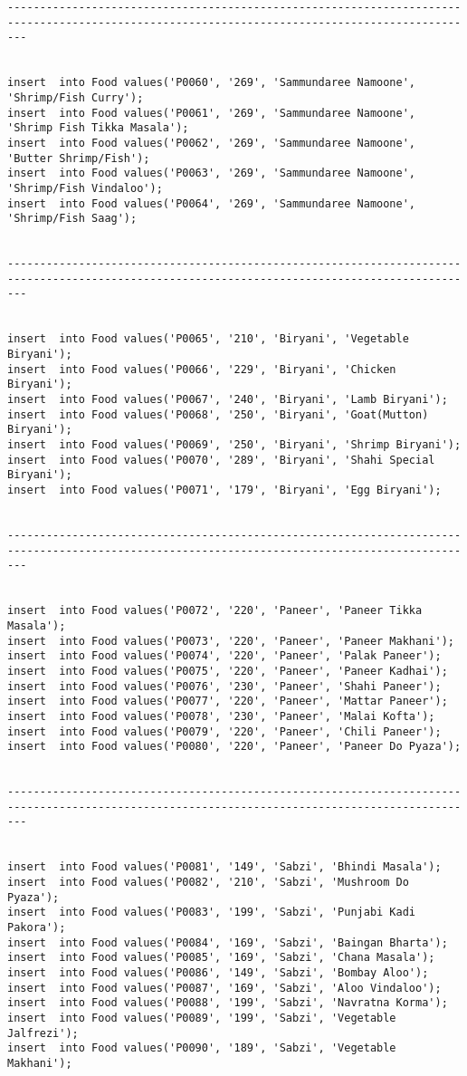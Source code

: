\documentclass[a4,12pt]{report}
\begin{document}
\begin{lstlisting}
-----------------------------------------------------------------------------------------------------------------------------------------------


insert  into Food values('P0060', '269', 'Sammundaree Namoone', 'Shrimp/Fish Curry');
insert  into Food values('P0061', '269', 'Sammundaree Namoone', 'Shrimp Fish Tikka Masala');
insert  into Food values('P0062', '269', 'Sammundaree Namoone', 'Butter Shrimp/Fish');
insert  into Food values('P0063', '269', 'Sammundaree Namoone', 'Shrimp/Fish Vindaloo');
insert  into Food values('P0064', '269', 'Sammundaree Namoone', 'Shrimp/Fish Saag');


-----------------------------------------------------------------------------------------------------------------------------------------------


insert  into Food values('P0065', '210', 'Biryani', 'Vegetable Biryani');
insert  into Food values('P0066', '229', 'Biryani', 'Chicken Biryani');
insert  into Food values('P0067', '240', 'Biryani', 'Lamb Biryani');
insert  into Food values('P0068', '250', 'Biryani', 'Goat(Mutton) Biryani');
insert  into Food values('P0069', '250', 'Biryani', 'Shrimp Biryani');
insert  into Food values('P0070', '289', 'Biryani', 'Shahi Special Biryani');
insert  into Food values('P0071', '179', 'Biryani', 'Egg Biryani');


-----------------------------------------------------------------------------------------------------------------------------------------------


insert  into Food values('P0072', '220', 'Paneer', 'Paneer Tikka Masala');
insert  into Food values('P0073', '220', 'Paneer', 'Paneer Makhani');
insert  into Food values('P0074', '220', 'Paneer', 'Palak Paneer');
insert  into Food values('P0075', '220', 'Paneer', 'Paneer Kadhai');
insert  into Food values('P0076', '230', 'Paneer', 'Shahi Paneer');
insert  into Food values('P0077', '220', 'Paneer', 'Mattar Paneer');
insert  into Food values('P0078', '230', 'Paneer', 'Malai Kofta');
insert  into Food values('P0079', '220', 'Paneer', 'Chili Paneer');
insert  into Food values('P0080', '220', 'Paneer', 'Paneer Do Pyaza');


-----------------------------------------------------------------------------------------------------------------------------------------------


insert  into Food values('P0081', '149', 'Sabzi', 'Bhindi Masala');
insert  into Food values('P0082', '210', 'Sabzi', 'Mushroom Do Pyaza');
insert  into Food values('P0083', '199', 'Sabzi', 'Punjabi Kadi Pakora');
insert  into Food values('P0084', '169', 'Sabzi', 'Baingan Bharta');
insert  into Food values('P0085', '169', 'Sabzi', 'Chana Masala');
insert  into Food values('P0086', '149', 'Sabzi', 'Bombay Aloo');
insert  into Food values('P0087', '169', 'Sabzi', 'Aloo Vindaloo');
insert  into Food values('P0088', '199', 'Sabzi', 'Navratna Korma');
insert  into Food values('P0089', '199', 'Sabzi', 'Vegetable Jalfrezi');
insert  into Food values('P0090', '189', 'Sabzi', 'Vegetable Makhani');



\end{lstlisting}
\end{document}

